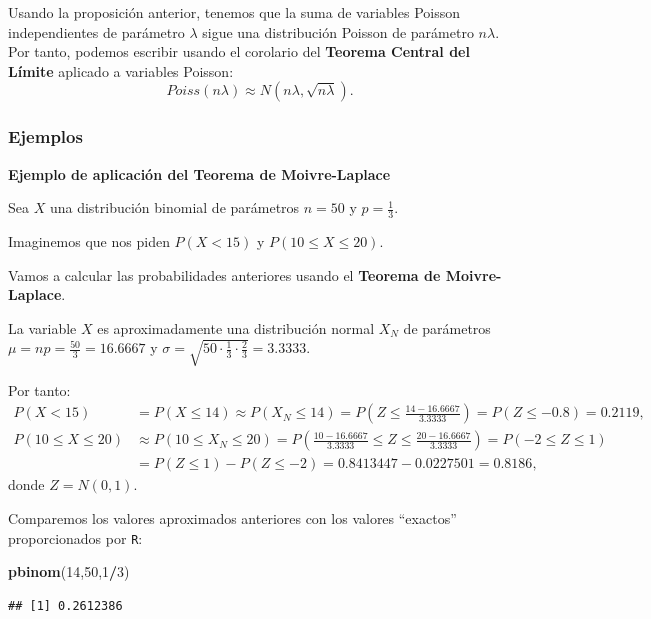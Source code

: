 \documentclass[]{book}
\newenvironment{Shaded}{\begin{snugshade}}{\end{snugshade}}
\newcommand{\DecValTok}[1]{\textcolor[rgb]{0.00,0.00,0.81}{#1}}
\newcommand{\KeywordTok}[1]{\textcolor[rgb]{0.13,0.29,0.53}{\textbf{#1}}}
\newcommand{\NormalTok}[1]{#1}
\newcommand{\OperatorTok}[1]{\textcolor[rgb]{0.81,0.36,0.00}{\textbf{#1}}}
\begin{document}
Usando la proposición anterior, tenemos que la suma de variables Poisson independientes de parámetro \(\lambda\) sigue una distribución Poisson de parámetro \(n\lambda\). Por tanto, podemos escribir usando el corolario del \textbf{Teorema Central del Límite} aplicado a variables Poisson:
\[
Poiss(n\lambda)\approx N(n\lambda,\sqrt{n\lambda}).
\]

\hypertarget{ejemplos-20}{%
\subsubsection{Ejemplos}\label{ejemplos-20}}

\textbf{Ejemplo de aplicación del Teorema de Moivre-Laplace}

Sea \(X\) una distribución binomial de parámetros \(n=50\) y \(p=\frac{1}{3}\).

Imaginemos que nos piden \(P(X < 15)\) y \(P(10\leq X\leq 20)\).

Vamos a calcular las probabilidades anteriores usando el \textbf{Teorema de Moivre-Laplace}.

La variable \(X\) es aproximadamente una distribución normal \(X_N\) de parámetros \(\mu = np=\frac{50}{3}=16.6667\) y \(\sigma=\sqrt{50\cdot\frac{1}{3}\cdot \frac{2}{3}}=3.3333\).

Por tanto:
\[
\begin{array}{rl}
P(X< 15) & = P(X\leq 14) \approx P(X_N \leq 14)=P\left(Z\leq \frac{14-16.6667}{3.3333}\right) =P(Z\leq -0.8) = 0.2119,\\
P(10\leq X\leq 20) & \approx P(10\leq X_N \leq 20) = P\left(\frac{10-16.6667}{3.3333}\leq  Z\leq \frac{20-16.6667}{3.3333}\right) = P(-2\leq Z\leq 1) \\ & = P(Z\leq 1)-P(Z\leq -2)=0.8413447-0.0227501 = 0.8186,
\end{array}
\]
donde \(Z=N(0,1)\).

Comparemos los valores aproximados anteriores con los valores ``exactos'' proporcionados por \texttt{R}:

\begin{Shaded}
\begin{Highlighting}[]
\KeywordTok{pbinom}\NormalTok{(}\DecValTok{14}\NormalTok{,}\DecValTok{50}\NormalTok{,}\DecValTok{1}\OperatorTok{/}\DecValTok{3}\NormalTok{)}
\end{Highlighting}
\end{Shaded}

\begin{verbatim}
## [1] 0.2612386
\end{verbatim}
\end{document}
